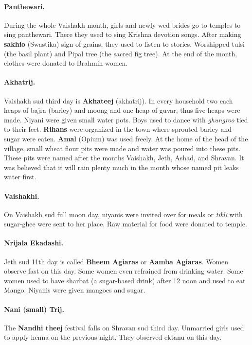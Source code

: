 \paragraph{Panthewari.} During the whole Vaishakh month, girls and newly wed
brides go to temples to sing panthewari. There they used to sing Krishna
devotion songs.  After making \textbf{sakhio} (Swastika) sign of grains, they
used to listen to stories. Worshipped tulsi (the basil plant) and Pipal tree
(the sacred fig tree). At the end of the month, clothes were donated to Brahmin
women.
\paragraph{Akhatrij.} Vaishakh sud third day is \textbf{Akhateej}
(akhatrij). In every household two each heaps of bajra (barley) and moong and
one heap of guvar, thus five heaps were made. Niyani were given small water
pots. Boys used to dance with \textit{ghungroo} tied to their feet.
\textbf{Rihans} were organized in the town where sprouted barley and sugar were
eaten. \textbf{Amal} (Opium) was used freely. At the home of the head of the
village, small wheat flour pits were made and water was poured into these pits.
These pits were named after the months Vaishakh, Jeth, Ashad, and Shravan. It
was believed that it will rain plenty much in the month whose named pit leaks
water first.
\paragraph{Vaishakhi.} On Vaishakh sud full moon day, niyanis
were invited over for meals or \textit{tikli} with sugar-ghee were sent to her
place. Raw material for food were donated to temple. 
\paragraph{Nrijala
Ekadashi.} Jeth sud 11th day is called \textbf{Bheem Agiaras} or \textbf{Aamba
Agiaras}. Women observe fast on this day. Some women even refrained from
drinking water. Some women used to have sharbat (a sugar-based drink) after 12
noon and used to eat Mango. Niyanis were given mangoes and sugar.

\paragraph{Nani (small) Trij.} The \textbf{Nandhi theej} festival falls on
Shravan sud third day. Unmarried girls used to apply henna on the previous
night. They observed ektanu on this day.
